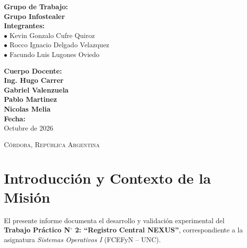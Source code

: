 \documentclass[10pt,a4paper]{article}
\begin{document}
\begin{titlepage}
    \begin{minipage}{0.54\textwidth}
        \begin{flushleft} \normalsize
            \textbf{\color{uncblue}Grupo de Trabajo:}\\[0.15cm]
            \textbf{Grupo Infostealer}\\[0.3cm]
            \textbf{\color{uncblue}Integrantes:}\\[0.15cm]
            $\bullet$ Kevin Gonzalo Cufre Quiroz\\
            $\bullet$ Rocco Ignacio Delgado Velazquez\\
            $\bullet$ Facundo Luis Lugones Oviedo
        \end{flushleft}
    \end{minipage}
    \hfill
    \begin{minipage}{0.42\textwidth}
        \begin{flushright} \normalsize
            \textbf{\color{uncblue}Cuerpo Docente:}\\[0.15cm]
            \textbf{Ing. Hugo Carrer}\\
            \textbf{Gabriel Valenzuela}\\
            \textbf{Pablo Martinez}\\
            \textbf{Nicolas Melia}\\[0.3cm]
            \textbf{\color{uncblue}Fecha:}\\[0.15cm]
            Octubre de 2026
        \end{flushright}
    \end{minipage}
    
    \vfill
    \vspace{0.5cm}
    {\footnotesize\scshape Córdoba, República Argentina}
\end{titlepage}

\hypersetup{pageanchor=true}

\setcounter{section}{-1}
\section{Introducción y Contexto de la Misión}

El presente informe documenta el desarrollo y validación experimental del \textbf{Trabajo Práctico N$^\circ$ 2: “Registro Central NEXUS”}, correspondiente a la asignatura \textit{Sistemas Operativos I} (FCEFyN -- UNC).
\end{document}
